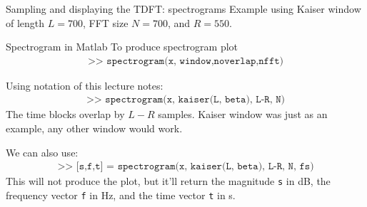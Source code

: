\documentclass[10pt]{beamer}
\begin{document}
%
\begin{frame}{Sampling and displaying the TDFT: spectrograms}
Example using Kaiser window of length $L = 700$, FFT size $N = 700$, and $R = 550$.
\begin{center}
	\resizebox{0.9\textwidth}{!}{}
\end{center}
\end{frame}

\begin{frame}{Spectrogram in Matlab}
	To produce spectrogram plot
	\begin{align*}
		\texttt{>> spectrogram(x, window,noverlap,nfft)} \tag{Matlab notation}
	\end{align*}
	
	Using notation of this lecture notes:
	\begin{align*}
	\texttt{>> spectrogram(x, kaiser(L, beta), L-R, N)} \tag{this lecture's notation}
	\end{align*}
	The time blocks overlap by $L-R$ samples. Kaiser window was just as an example, any other window would work.
	
	\vspace{0.25cm}
	
	We can also use:
	\begin{align*}
		\texttt{>> [s,f,t] = spectrogram(x, kaiser(L, beta), L-R, N, fs)}
	\end{align*}
	This will not produce the plot, but it'll return the magnitude \texttt{s} in dB, the frequency vector \texttt{f} in Hz, and the time vector \texttt{t} in s.
\end{frame}
\end{document}
